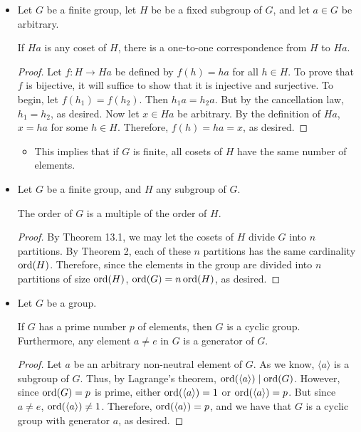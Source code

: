 \documentclass[../notes.tex]{subfiles}
\begin{document}
\begin{itemize}
\begin{theorem}
    \end{theorem}
    \item Let $G$ be a finite group, let $H$ be be a fixed subgroup of $G$, and let $a\in G$ be arbitrary.
    \begin{theorem}
        If $Ha$ is any coset of $H$, there is a one-to-one correspondence from $H$ to $Ha$.
        \begin{proof}
            Let $f:H\to Ha$ be defined by $f(h)=ha$ for all $h\in H$. To prove that $f$ is bijective, it will suffice to show that it is injective and surjective. To begin, let $f(h_1)=f(h_2)$. Then $h_1a=h_2a$. But by the cancellation law, $h_1=h_2$, as desired. Now let $x\in Ha$ be arbitrary. By the definition of $Ha$, $x=ha$ for some $h\in H$. Therefore, $f(h)=ha=x$, as desired.
        \end{proof}
    \end{theorem}
    \begin{itemize}
        \item This implies that if $G$ is finite, all cosets of $H$ have the same number of elements.
    \end{itemize}
    \item Let $G$ be a finite group, and $H$ any subgroup of $G$.
    \begin{theorem}
        The order of $G$ is a multiple of the order of $H$.
        \begin{proof}
            By Theorem 13.1, we may let the cosets of $H$ divide $G$ into $n$ partitions. By Theorem 2, each of these $n$ partitions has the same cardinality $\operatorname{ord}(H)$. Therefore, since the elements in the group are divided into $n$ partitions of size $\operatorname{ord}(H)$, $\operatorname{ord}(G)=n\operatorname{ord}(H)$, as desired.
        \end{proof}
    \end{theorem}
    \item Let $G$ be a group.
    \begin{theorem}
        If $G$ has a prime number $p$ of elements, then $G$ is a cyclic group. Furthermore, any element $a\neq e$ in $G$ is a generator of $G$.
        \begin{proof}
            Let $a$ be an arbitrary non-neutral element of $G$. As we know, $\langle a\rangle$ is a subgroup of $G$. Thus, by Lagrange's theorem, $\operatorname{ord}(\langle a\rangle)\mid\operatorname{ord}(G)$. However, since $\operatorname{ord}(G)=p$ is prime, either $\operatorname{ord}(\langle a\rangle)=1$ or $\operatorname{ord}(\langle a\rangle)=p$. But since $a\neq e$, $\operatorname{ord}(\langle a\rangle)\neq 1$. Therefore, $\operatorname{ord}(\langle a\rangle)=p$, and we have that $G$ is a cyclic group with generator $a$, as desired.

\end{proof}
\end{theorem}
\end{itemize}
\end{document}
